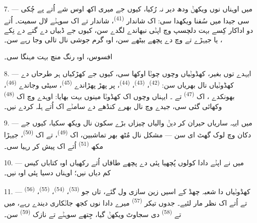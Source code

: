7. --- میں اوہناں نوں ویکھݨ ودھ دیر نہ رُکیا، کیوں جے میری اکھ اوس شے اُتے پے چُکی
سی جیدا میں سُفنا ویکھدا سی: اک شاندار 
\textsuperscript{(41)}، شاندار  تے اک سوہݨے لال  سمیت۔
 اُتے دو اداکار کِسے بہت دلچسپ  وچ اپݨی 
نبھاندے لگدے سن، کیوں جے ڈبیاں دے گتے دے نِکے ، یا جیہڑے
 تے  وچ  دے پچھے بیٹھے سن،
اوہ گرم جوشی نال تالی وجا رہے سن۔

افسوس، اوہ رنگ منچ بہت مہنگا سی۔

8. --- ایہدے توں بغیر، کھڈوݨیاں وچوں چوݨا اوکھا سی، کیوں جے کھڑکیاں ہر طرحاں دے
کھڈوݨیاں نال بھریاں سن:  \textsuperscript{(42)}،
 \textsuperscript{(43)}،  \textsuperscript{(44)}، پر
پھڑ پھڑاندے  \textsuperscript{(45)}، سیٹی وجاندے 
\textsuperscript{(46)}، بھونکدے ، اک 
\textsuperscript{(47)} تے ۔ ایہناں وچوں اک کھڈوݨا مینوں بہت بھایا:
اوہدے وچ اک  \textsuperscript{(48)} وکھائی گئی سی، جیدے وچ
 نال بھرے کنڈھے دے سامݨے  اک
 اُتے ہلہ کردے نیں۔


9. --- میں ایہہ ساریاں حیران کر دیݨ والیاں چیزاں بڑے سکون نال ویکھ سکیا، کیوں جے
دکان وچ لوک گھٹ ای سن — مشکل نال مُٹھ بھر تماشبین، اک 
\textsuperscript{(49)}، تے اک  \textsuperscript{(50)}، جیہڑا
مکھ  \textsuperscript{(51)} اُتے اک  پیش کر رہیا سی۔

10. --- میں نے اپݨے دادا کولوں پُچھیا پئی  دے پچھے طاقاں اُتے رکھیاں
اوہ کتاباں کیس کم دیاں نیں؛ اوہناں دسیا پئی اوہ  نیں۔

\VUsaut{3.6mm}
\VUsaut{2.8mm}

11. --- کھڈوݨیاں دا شعبہ چھڈ کے اسیں زین سازی ول گئے، تاں جو 
\textsuperscript{(53)}،  \textsuperscript{(54)}، 
\textsuperscript{(55)}،  \textsuperscript{(56)} تے
 اُتے اک نظر مار لئیے۔ جدوں تیکر 
\textsuperscript{(57)} میرے دادا نوں کجھ جاݨکاری دیندے رہے، میں 
تے  \textsuperscript{(58)} دی سجاوٹ ویکھݨ گیا، جِتھے سوہݨے
 تے نازک  \textsuperscript{(59)} سن۔

